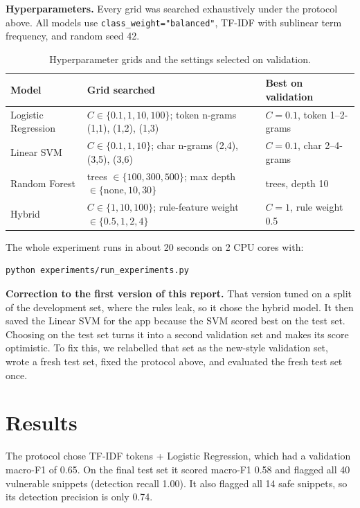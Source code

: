 \documentclass[11pt,a4paper]{article}
\newcommand{\code}[1]{\texttt{#1}}
\begin{document}
\textbf{Hyperparameters.} Every grid was searched exhaustively under the protocol above.
All models use \code{class\_weight="balanced"}, TF-IDF with sublinear term frequency, and
random seed 42.

\begin{table}[H]
\centering\small
\begin{tabularx}{\linewidth}{l >{\raggedright\arraybackslash}X >{\raggedright\arraybackslash}p{4.2cm}}
\toprule
Model & Grid searched & Best on validation \\
\midrule
Logistic Regression & $C \in \{0.1, 1, 10, 100\}$; token n-grams (1,1), (1,2), (1,3) & $C = 0.1$, token 1--2-grams \\
Linear SVM & $C \in \{0.1, 1, 10\}$; char n-grams (2,4), (3,5), (3,6) & $C = 0.1$, char 2--4-grams \\
Random Forest & trees $\in \{100, 300, 500\}$; max depth $\in \{\text{none}, 10, 30\}$ & 100 trees, depth 10 \\
Hybrid & $C \in \{1, 10, 100\}$; rule-feature weight $\in \{0.5, 1, 2, 4\}$ & $C = 1$, rule weight 0.5 \\
\bottomrule
\end{tabularx}
\caption{Hyperparameter grids and the settings selected on validation.}
\end{table}

The whole experiment runs in about 20 seconds on 2 CPU cores with:
\begin{lstlisting}[language=bash]
python experiments/run_experiments.py
\end{lstlisting}

\textbf{Correction to the first version of this report.} That version tuned on a split of
the development set, where the rules leak, so it chose the hybrid model. It then saved the
Linear SVM for the app because the SVM scored best on the test set. Choosing on the test
set turns it into a second validation set and makes its score optimistic. To fix this, we
relabelled that set as the new-style validation set, wrote a fresh test set, fixed the
protocol above, and evaluated the fresh test set once.

\section{Results}
\label{sec:results}

The protocol chose TF-IDF tokens + Logistic Regression, which had a validation macro-F1
of 0.65. On the final test set it scored macro-F1 0.58 and flagged all 40 vulnerable
snippets (detection recall 1.00). It also flagged all 14 safe snippets, so its detection
precision is only 0.74.
\end{document}
